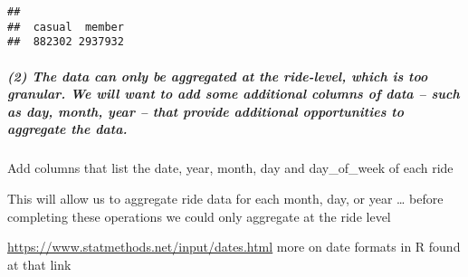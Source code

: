 \documentclass[
]{article}
\newenvironment{Shaded}{\begin{snugshade}}{\end{snugshade}}
\newcommand{\FunctionTok}[1]{\textcolor[rgb]{0.00,0.00,0.00}{#1}}
\newcommand{\NormalTok}[1]{#1}
\newcommand{\OtherTok}[1]{\textcolor[rgb]{0.56,0.35,0.01}{#1}}
\newcommand{\SpecialCharTok}[1]{\textcolor[rgb]{0.00,0.00,0.00}{#1}}
\newcommand{\StringTok}[1]{\textcolor[rgb]{0.31,0.60,0.02}{#1}}
\begin{document}
\begin{verbatim}
## 
##  casual  member 
##  882302 2937932
\end{verbatim}

\hypertarget{the-data-can-only-be-aggregated-at-the-ride-level-which-is-too-granular.-we-will-want-to-add-some-additional-columns-of-data-such-as-day-month-year-that-provide-additional-opportunities-to-aggregate-the-data.}{%
\subparagraph{(2) The data can only be aggregated at the ride-level,
which is too granular. We will want to add some additional columns of
data -- such as day, month, year -- that provide additional
opportunities to aggregate the
data.}\label{the-data-can-only-be-aggregated-at-the-ride-level-which-is-too-granular.-we-will-want-to-add-some-additional-columns-of-data-such-as-day-month-year-that-provide-additional-opportunities-to-aggregate-the-data.}}

Add columns that list the date, year, month, day and day\_of\_week of
each ride

This will allow us to aggregate ride data for each month, day, or year
\ldots{} before completing these operations we could only aggregate at
the ride level

\url{https://www.statmethods.net/input/dates.html} more on date formats
in R found at that link

\begin{Shaded}
\end{Shaded}
\end{document}
